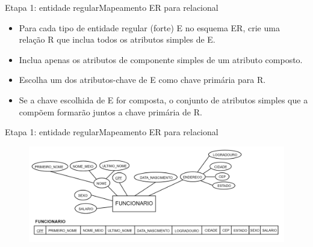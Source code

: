 \documentclass[t]{beamer}
\begin{document}

\begin{ftst}{Etapa 1: entidade regular}{Mapeamento ER para relacional}
\begin{itemize}
    \item Para cada tipo de entidade regular (forte) E no esquema ER, crie uma relação R que inclua todos os atributos simples de E.
    \item Inclua apenas os atributos de componente simples de um atributo composto.
    \item Escolha um dos atributos-chave de E como chave primária para R.
    \item Se a chave escolhida de E for composta, o conjunto de atributos simples que a compõem formarão juntos a chave primária de R.
    
\end{itemize}
\end{ftst}


\begin{ftst}{Etapa 1: entidade regular}{Mapeamento ER para relacional}
\vone
\begin{figure}
    \centering
    \includegraphics[scale=0.15]{Figuras/03_03.png}
\end{figure}
\end{ftst}

\end{document}
